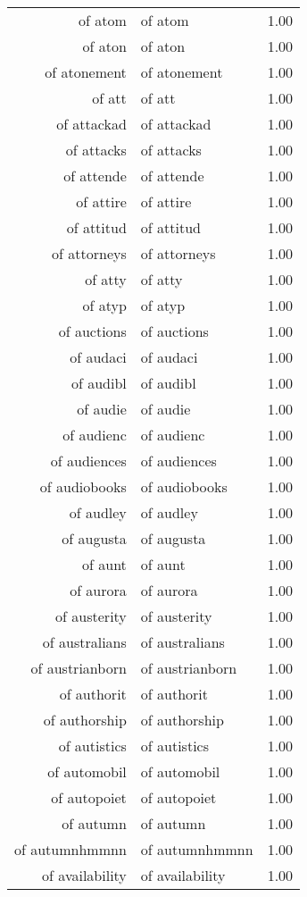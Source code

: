 \begin{table}[ht]
\begin{tabular}{rlr}
  of atom & of atom & 1.00 \\ 
  of aton & of aton & 1.00 \\ 
  of atonement & of atonement & 1.00 \\ 
  of att & of att & 1.00 \\ 
  of attackad & of attackad & 1.00 \\ 
  of attacks & of attacks & 1.00 \\ 
  of attende & of attende & 1.00 \\ 
  of attire & of attire & 1.00 \\ 
  of attitud & of attitud & 1.00 \\ 
  of attorneys & of attorneys & 1.00 \\ 
  of atty & of atty & 1.00 \\ 
  of atyp & of atyp & 1.00 \\ 
  of auctions & of auctions & 1.00 \\ 
  of audaci & of audaci & 1.00 \\ 
  of audibl & of audibl & 1.00 \\ 
  of audie & of audie & 1.00 \\ 
  of audienc & of audienc & 1.00 \\ 
  of audiences & of audiences & 1.00 \\ 
  of audiobooks & of audiobooks & 1.00 \\ 
  of audley & of audley & 1.00 \\ 
  of augusta & of augusta & 1.00 \\ 
  of aunt & of aunt & 1.00 \\ 
  of aurora & of aurora & 1.00 \\ 
  of austerity & of austerity & 1.00 \\ 
  of australians & of australians & 1.00 \\ 
  of austrianborn & of austrianborn & 1.00 \\ 
  of authorit & of authorit & 1.00 \\ 
  of authorship & of authorship & 1.00 \\ 
  of autistics & of autistics & 1.00 \\ 
  of automobil & of automobil & 1.00 \\ 
  of autopoiet & of autopoiet & 1.00 \\ 
  of autumn & of autumn & 1.00 \\ 
  of autumnhmmnn & of autumnhmmnn & 1.00 \\ 
  of availability & of availability & 1.00 \\ 

\end{tabular}
\end{table}
